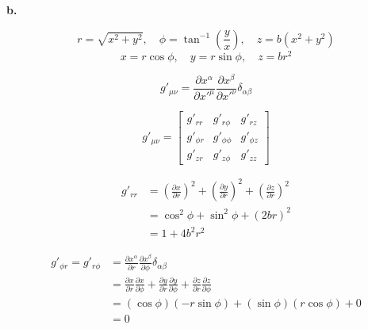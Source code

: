 \documentclass[12pt]{article}
\begin{document}
\textbf{b.}

\[
      r = \sqrt{x^2+y^2}, \quad \phi = \tan^{-1}(\frac{y}{x}), \quad z = b (x^2+y^2)
\]
\[
      x = r\cos{\phi}, \quad y = r\sin{\phi}, \quad z = br^2
\]

\[
      g'_{\mu\nu} = \frac{\partial x^\alpha}{\partial x'^\mu} \frac{\partial x^\beta}{\partial x'^\nu} \delta_{\alpha\beta}
\]


\begin{equation*}
      g'_{\mu \nu} =
      \begin{bmatrix}
            g'_{r r}    & g'_{r \phi}    & g'_{r z}    \\
            g'_{\phi r} & g'_{\phi \phi} & g'_{\phi z} \\
            g'_{z r}    & g'_{z \phi}    & g'_{z z}
      \end{bmatrix}
\end{equation*}

\begin{equation*}
      \begin{split}
            g'_{r r} & = {\left(\frac{\partial x}{\partial r} \right)}^2 +
            {\left(\frac{\partial y}{\partial r} \right)}^2 +
            {\left(\frac{\partial z}{\partial r} \right)}^2                \\
                     & = \cos^2\phi + \sin^2\phi + (2br)^2                 \\
                     & = 1 + 4b^2r^2
      \end{split}
\end{equation*}

\begin{equation*}
      \begin{split}
            g'_{\phi r} = g'_{r \phi} & =
            \frac{\partial x^\alpha}{\partial r} \frac{\partial x^\beta}{\partial \phi} \delta_{\alpha\beta}                                                                                                                               \\
                                      & = \frac{\partial x}{\partial r} \frac{\partial x}{\partial \phi} + \frac{\partial y}{\partial r} \frac{\partial y}{\partial \phi} + \frac{\partial z}{\partial r} \frac{\partial z}{\partial \phi} \\
                                      & = (\cos\phi)(-r \sin\phi) + (\sin\phi)(r\cos\phi) + 0                                                                                                                                              \\
                                      & = 0
      \end{split}
\end{equation*}
\end{document}
